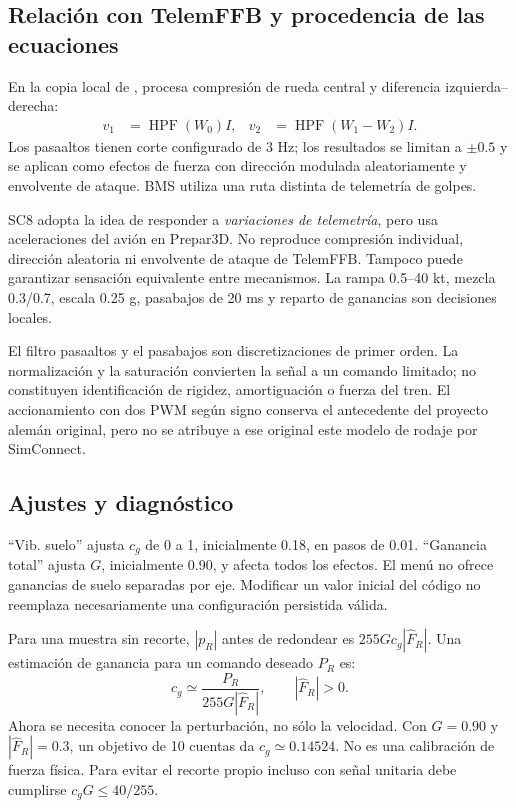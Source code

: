 \subsection{Relación con TelemFFB y procedencia de las ecuaciones}
En la copia local de ,  procesa compresión de rueda central y diferencia izquierda--derecha:
\begin{align}
v_1&=\operatorname{HPF}(W_0)I, & v_2&=\operatorname{HPF}(W_1-W_2)I.
\end{align}
Los pasaaltos tienen corte configurado de 3 Hz; los resultados se limitan a $\pm0.5$ y se aplican como efectos de fuerza con dirección modulada aleatoriamente y envolvente de ataque. BMS utiliza una ruta distinta de telemetría de golpes.

SC8 adopta la idea de responder a \emph{variaciones de telemetría}, pero usa aceleraciones del avión en Prepar3D. No reproduce compresión individual, dirección aleatoria ni envolvente de ataque de TelemFFB. Tampoco puede garantizar sensación equivalente entre mecanismos. La rampa 0.5--40 kt, mezcla 0.3/0.7, escala 0.25 g, pasabajos de 20 ms y reparto de ganancias son decisiones locales.

El filtro pasaaltos y el pasabajos son discretizaciones de primer orden. La normalización y la saturación convierten la señal a un comando limitado; no constituyen identificación de rigidez, amortiguación o fuerza del tren. El accionamiento con dos PWM según signo conserva el antecedente del proyecto alemán original, pero no se atribuye a ese original este modelo de rodaje por SimConnect.

\subsection{Ajustes y diagnóstico}
``Vib. suelo'' ajusta $c_g$ de 0 a 1, inicialmente 0.18, en pasos de 0.01. ``Ganancia total'' ajusta $G$, inicialmente 0.90, y afecta todos los efectos. El menú no ofrece ganancias de suelo separadas por eje. Modificar un valor inicial del código no reemplaza necesariamente una configuración persistida válida.

Para una muestra sin recorte, $|p_R|$ antes de redondear es $255Gc_g|\widehat F_R|$. Una estimación de ganancia para un comando deseado $P_R$ es:
\begin{equation}
c_g\simeq\frac{P_R}{255G|\widehat F_R|},\qquad |\widehat F_R|>0.
\end{equation}
Ahora se necesita conocer la perturbación, no sólo la velocidad. Con $G=0.90$ y $|\widehat F_R|=0.3$, un objetivo de 10 cuentas da $c_g\simeq0.14524$. No es una calibración de fuerza física. Para evitar el recorte propio incluso con señal unitaria debe cumplirse $c_gG\le40/255$.

